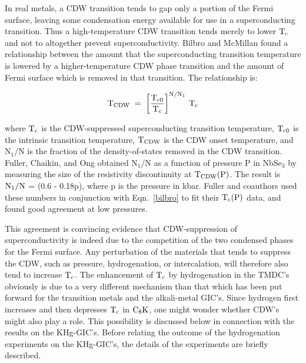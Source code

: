        In real metals, a CDW transition tends to gap only a portion of the
Fermi  surface, leaving some  condensation energy available  for   use in a
superconducting  transition.  Thus a  high-temperature CDW transition tends
merely to lower $\rm T_c$ and not to  altogether prevent superconductivity.
Bilbro and  McMillan  found  a relationship between the   amount   that the
superconducting transition  temperature is lowered by  a higher-temperature
CDW phase  transition and  the amount of  Fermi surface which is removed in
that transition.\cite{bilbro76} The relationship is:

\begin{equation}
\label{bilbro}
\rm T_{CDW} \; = \; \left[ \frac{T_{c0}}{T_c} \right]^{N/N_1} \: T_c
\end{equation}
        
\noindent where $\rm T_c$ is the CDW-suppressed superconducting transition
temperature, $\rm  T_{c0}$ is  the intrinsic  transition  temperature, $\rm
T_{CDW}$ is the CDW onset  temperature, and  N$_1$/N is the fraction of the
density-of-states  removed  in the CDW  transition.   Fuller, Chaikin,  and
Ong\cite{fuller81} obtained N$_1$/N as a function of pressure P in NbSe$_3$
by measuring the size of the resistivity discontinuity at $\rm T_{CDW}(P)$.
The result is $\rm N_1/N$ = (0.6 - 0.18p), where p is the pressure in kbar.
Fuller and coauthors\cite{fuller81}  used these numbers in conjunction with
Eqn.~\ref{bilbro} to fit their $\rm T_c(P)$ data, and  found good agreement
at    low   pressures.  

        This  agreement   is convincing evidence   that  CDW-suppression of
superconductivity is indeed  due  to the competition of the  two  condensed
phases for the Fermi surface.  Any perturbation of the materials that tends
to  suppress the CDW,   such as pressure,  hydrogenation, or intercalation,
will therefore  also tend to  increase $\rm T_c$.   The enhancement of $\rm
T_c$ by hydrogenation in  the  TMDC's obviously is  due to a very different
mechanism than that which  has been put forward  for the transition  metals
and the alkali-metal  GIC's.  Since  hydrogen   first  increases and   then
depresses $\rm T_c$  in $\rm C_8K$, one  might wonder  whether  CDW's might
also play a role.  This  possibility  is discussed below in connection with
the  results   on the  KHg-GIC's.   Before   relating the  outcome   of the
hydrogenation experiments on the KHg-GIC's, the details  of the experiments
are briefly described.



